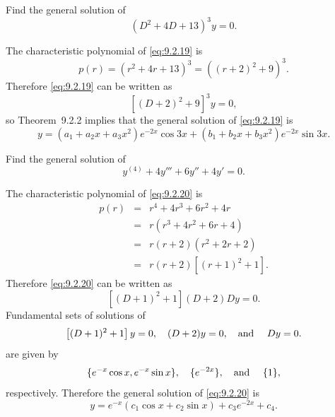 \setcounter{example}{5}
\setcounter{equation}{18}
\begin{example}
  \label{example:9.2.6} \rm Find the general solution of
  \begin{equation}
    \label{eq:9.2.19}(D^{2}+4D+13)^{3}y=0.
  \end{equation}
\end{example}
\begin{examplesolution}
\solution The characteristic polynomial of \eqref{eq:9.2.19} is
\[
  p(r)=(r^{2}+4r+13)^{3}=\left((r+2)^{2}+9\right)^{3}.
\]
Therefore \eqref{eq:9.2.19} can be written as
\[
  [(D+2)^{2}+9]^{3}y=0,
\]
so Theorem~9.2.2 implies that the general solution of \eqref{eq:9.2.19} is
\[
  y=(a_{1}+a_{2}x+a_{3}x^{2})e^{-2x}\cos3x +(b_{1}+b_{2}x+b_{3}x^{2})e^{-2x}\sin3x.
\]
\end{examplesolution}

\setcounter{example}{6}
\setcounter{equation}{19}
\begin{example}
  \label{example:9.2.7} \rm Find the general solution of
  \begin{equation}
    \label{eq:9.2.20}y^{(4)}+4y'''+6y''+4y'=0.
  \end{equation}
\end{example}
\begin{examplesolution}
\solution The characteristic polynomial of \eqref{eq:9.2.20} is
\begin{eqnarray*}
  p(r) & = & r^{4}+4r^{3}+6r^{2}+4r \\
       & = & r(r^{3}+4r^{2}+6r+4)   \\
       & = & r(r+2)(r^{2}+2r+2)     \\
       & = & r(r+2)[(r+1)^{2}+1].
\end{eqnarray*}
Therefore \eqref{eq:9.2.20} can be written as
\[
  [(D+1)^{2}+1](D+2)Dy=0.
\]
Fundamental sets of solutions of
\[
  \left[(D+1)^{2}+1\right]y=0,\quad(D+2)y=0,\mbox{\quad and \quad}Dy=0.
\]
are given by
\[
  \{e^{-x}\cos x,e^{-x}\sin x\},\quad\{e^{-2x}\},\mbox{\quad and \quad}\{1\},
\]
respectively. Therefore the general solution of \eqref{eq:9.2.20} is
\[
  y=e^{-x}(c_{1}\cos x+c_{2}\sin x)+c_{3}e^{-2x}+c_{4}.
\]
\end{examplesolution}

